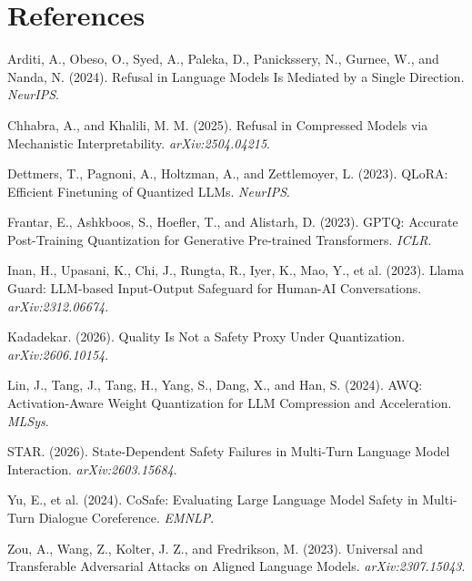 \documentclass[10pt,twocolumn,letterpaper]{article}
\begin{document}
\section*{References}
\footnotesize
Arditi, A., Obeso, O., Syed, A., Paleka, D., Panickssery, N., Gurnee, W., and
Nanda, N. (2024). Refusal in Language Models Is Mediated by a Single Direction.
\textit{NeurIPS}.

Chhabra, A., and Khalili, M. M. (2025). Refusal in Compressed Models via
Mechanistic Interpretability. \textit{arXiv:2504.04215}.

Dettmers, T., Pagnoni, A., Holtzman, A., and Zettlemoyer, L. (2023). QLoRA:
Efficient Finetuning of Quantized LLMs. \textit{NeurIPS}.

Frantar, E., Ashkboos, S., Hoefler, T., and Alistarh, D. (2023). GPTQ: Accurate
Post-Training Quantization for Generative Pre-trained Transformers. \textit{ICLR}.

Inan, H., Upasani, K., Chi, J., Rungta, R., Iyer, K., Mao, Y., et al. (2023).
Llama Guard: LLM-based Input-Output Safeguard for Human-AI Conversations.
\textit{arXiv:2312.06674}.

Kadadekar. (2026). Quality Is Not a Safety Proxy Under Quantization.
\textit{arXiv:2606.10154}.

Lin, J., Tang, J., Tang, H., Yang, S., Dang, X., and Han, S. (2024). AWQ:
Activation-Aware Weight Quantization for LLM Compression and Acceleration.
\textit{MLSys}.

STAR. (2026). State-Dependent Safety Failures in Multi-Turn Language Model
Interaction. \textit{arXiv:2603.15684}.

Yu, E., et al. (2024). CoSafe: Evaluating Large Language Model Safety in Multi-Turn
Dialogue Coreference. \textit{EMNLP}.

Zou, A., Wang, Z., Kolter, J. Z., and Fredrikson, M. (2023). Universal and
Transferable Adversarial Attacks on Aligned Language Models.
\textit{arXiv:2307.15043}.
\end{document}
